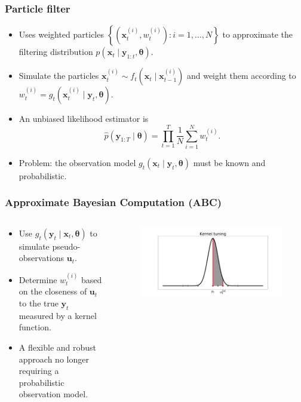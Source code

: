 \documentclass{beamer}
\newcommand{\bx}{\bm{x}}
\newcommand{\by}{\bm{y}}
\newcommand{\bu}{\bm{u}}
\newcommand{\btheta}{\bm{\theta}}
\newcommand{\trans}{f}
\newcommand{\obs}{g}
\begin{document}
    \begin{frame}
    \frametitle{Particle filter}
    \begin{itemize}
        \item Uses weighted particles $\left\{\left(\bx_t^{(i)}, w_t^{(i)}\right) : i = 1, \ldots, N\right\}$ to approximate the filtering distribution $p(\bx_t \mid \by_{1:t}, \btheta)$.
        \item Simulate the particles $\bx_t^{(i)} \sim \trans_t(\bx_t \mid \bx_{t-1}^{(i)})$ and weight them according to $w_t^{(i)} = \obs_t(\bx_t^{(i)} \mid \by_t, \btheta)$.
        \item An unbiased likelihood estimator is
        \begin{equation*}
        \widehat{p}(\by_{1:T} \mid \btheta) = \prod_{t=1}^T \frac{1}{N} \sum_{i=1}^N w_t^{(i)}.
        \end{equation*}
        \item Problem: the observation model $\obs_t(\bx_t \mid \by_t, \btheta)$ must be known and probabilistic.
    \end{itemize}
    \end{frame}

    \begin{frame}
    \frametitle{Approximate Bayesian Computation (ABC)}
    \begin{columns}
        \begin{column}{0.45\textwidth}
            \begin{itemize}
                \item Use $\obs_t(\by_t \mid \bx_t, \btheta)$ to simulate pseudo-observations $\bu_t$.
                \item Determine $w_t^{(i)}$ based on the closeness of $\bu_t$ to the true $\by_t$ measured by a kernel function.
                \item A flexible and robust approach no longer requiring a probabilistic observation model.
            \end{itemize}
        \end{column}
%
        \begin{column}{0.5\textwidth}
            \begin{figure}
                \centering
                \includegraphics[width=\columnwidth]{images/kernel}
            \end{figure}
        \end{column}
    \end{columns}
    \end{frame}
\end{document}
